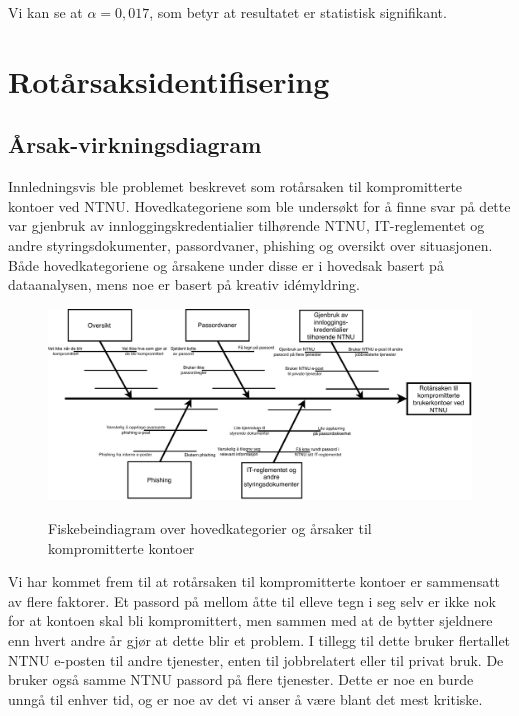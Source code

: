 Vi kan se at \(\alpha = 0,017\), som betyr at resultatet er statistisk signifikant. 


\section{Rotårsaksidentifisering}

\subsection{Årsak-virkningsdiagram}
Innledningsvis ble problemet beskrevet som rotårsaken til kompromitterte kontoer ved NTNU. Hovedkategoriene som ble undersøkt for å finne svar på dette var gjenbruk av innloggingskredentialier tilhørende NTNU, IT-reglementet og andre styringsdokumenter, passordvaner, phishing og oversikt over situasjonen. Både hovedkategoriene og årsakene under disse er i hovedsak basert på dataanalysen, mens noe er basert på kreativ idémyldring. 

\begin{figure}[H]
    \centering
    \includegraphics[scale=0.65]{case_2/bilder/fiskebein.pdf}
    \label{fig:fiskebein-case2}
    \caption[Fiskebeindiagram for kompromitterte kontoer]{Fiskebeindiagram over hovedkategorier og årsaker til kompromitterte kontoer}
\end{figure}

Vi har kommet frem til at rotårsaken til kompromitterte kontoer er sammensatt av flere faktorer. Et passord på mellom åtte til elleve tegn i seg selv er ikke nok for at kontoen skal bli kompromittert, men sammen med at de bytter sjeldnere enn hvert andre år gjør at dette blir et problem. I tillegg til dette bruker flertallet NTNU e-posten til andre tjenester, enten til jobbrelatert eller til privat bruk. De bruker også samme NTNU passord på flere tjenester. Dette er noe en burde unngå til enhver tid, og er noe av det vi anser å være blant det mest kritiske. 

